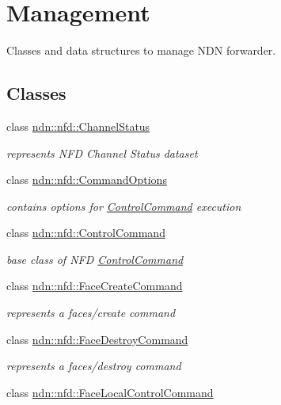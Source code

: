 \hypertarget{group__management}{}\section{Management}
\label{group__management}


Classes and data structures to manage N\+DN forwarder.  


\subsection*{Classes}
\begin{DoxyCompactItemize}
\item 
class \hyperlink{classndn_1_1nfd_1_1ChannelStatus}{ndn\+::nfd\+::\+Channel\+Status}
\begin{DoxyCompactList}\small\item\em represents N\+FD Channel Status dataset \end{DoxyCompactList}\item 
class \hyperlink{classndn_1_1nfd_1_1CommandOptions}{ndn\+::nfd\+::\+Command\+Options}
\begin{DoxyCompactList}\small\item\em contains options for \hyperlink{classndn_1_1nfd_1_1ControlCommand}{Control\+Command} execution \end{DoxyCompactList}\item 
class \hyperlink{classndn_1_1nfd_1_1ControlCommand}{ndn\+::nfd\+::\+Control\+Command}
\begin{DoxyCompactList}\small\item\em base class of N\+FD \hyperlink{classndn_1_1nfd_1_1ControlCommand}{Control\+Command} \end{DoxyCompactList}\item 
class \hyperlink{classndn_1_1nfd_1_1FaceCreateCommand}{ndn\+::nfd\+::\+Face\+Create\+Command}
\begin{DoxyCompactList}\small\item\em represents a faces/create command \end{DoxyCompactList}\item 
class \hyperlink{classndn_1_1nfd_1_1FaceDestroyCommand}{ndn\+::nfd\+::\+Face\+Destroy\+Command}
\begin{DoxyCompactList}\small\item\em represents a faces/destroy command \end{DoxyCompactList}\item 
class \hyperlink{classndn_1_1nfd_1_1FaceLocalControlCommand}{ndn\+::nfd\+::\+Face\+Local\+Control\+Command}

\end{DoxyCompactItemize}
